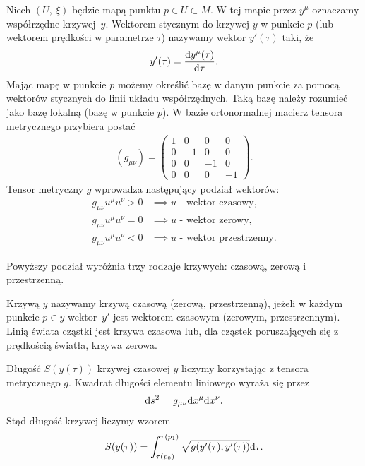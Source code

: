 \begin{definition}
Niech $(U,\ \xi)$ będzie mapą punktu $p\in U \subset M$. W tej mapie 
przez $y^\mu$ oznaczamy współrzędne krzywej~$y$.
Wektorem stycznym do krzywej $y$ w punkcie $p$  
(lub wektorem prędkości w 
parametrze $\tau$) nazywamy wektor $y'(\tau)$ taki, że
\begin{align*}
y' (\tau )= \frac{\text{d} y^\mu (\tau) }{\text{d} \tau}.
\end{align*}
Mając mapę w punkcie $p$ możemy określić bazę w danym punkcie
za pomocą wektorów stycznych do linii układu współrzędnych.
Taką bazę należy rozumieć jako bazę lokalną (bazę w punkcie $p$).
W bazie ortonormalnej macierz tensora metrycznego
przybiera postać 
\begin{align*}
( g_{\mu\nu} ) = \left(
\begin{array}{cccc}
1 & 0 & 0 & 0\\
0 & -1 & 0 & 0 \\
0 & 0 & -1 & 0 \\
0 & 0 & 0 & -1 
\end{array}
\right).
\end{align*}
Tensor metryczny $g$ wprowadza następujący podział wektorów:
\begin{align*}
g_{\mu\nu}u^\mu u^\nu > 0& \implies u \text{ - wektor czasowy,}\\
g_{\mu\nu}u^\mu u^\nu = 0& \implies u \text{ - wektor zerowy,}\\
g_{\mu\nu}u^\mu u^\nu < 0& \implies u \text{ - wektor przestrzenny.}
\end{align*}
\end{definition}
\noindent
Powyższy podział wyróżnia trzy rodzaje krzywych: czasową, 
zerową i przestrzenną.
\begin{definition}
Krzywą $y$ nazywamy krzywą czasową (zerową, przestrzenną),
jeżeli w każdym punkcie $p \in y$ wektor~$y'$ jest 
wektorem czasowym
(zerowym, przestrzennym). Linią świata cząstki
jest krzywa czasowa lub, dla cząstek 
poruszających się z prędkością światła, 
krzywa zerowa.
\end{definition}
Długość $S(y(\tau))$ krzywej czasowej $y$ liczymy 
korzystając z tensora metrycznego $g$. 
Kwadrat długości elementu liniowego wyraża się przez
\begin{align*}
\text{d} s^2 = g_{\mu\nu} \text{d} x^\mu \text{d} x^\nu.
\end{align*}
Stąd długość krzywej liczymy wzorem
\begin{align}\label{dlugosc_krzywej}
S( y(\tau) ) = \int_{\tau(p_0)}^{\tau(p_1)} \sqrt{g (
y' (\tau), y' (\tau) )} \text{d} \tau.
\end{align}
